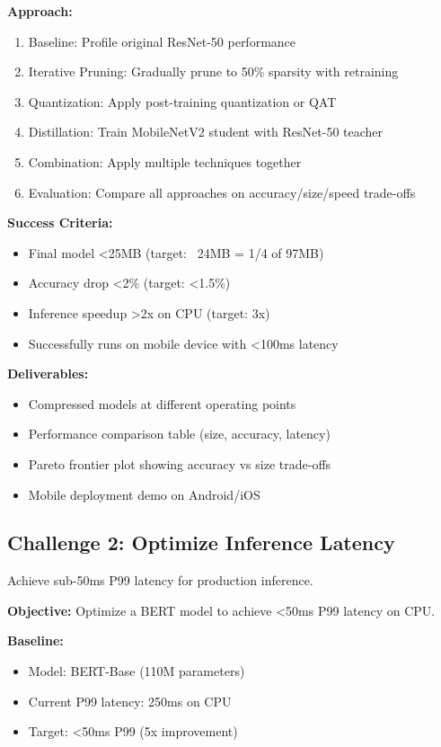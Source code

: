 \textbf{Approach:}
\begin{enumerate}
    \item Baseline: Profile original ResNet-50 performance
    \item Iterative Pruning: Gradually prune to 50\% sparsity with retraining
    \item Quantization: Apply post-training quantization or QAT
    \item Distillation: Train MobileNetV2 student with ResNet-50 teacher
    \item Combination: Apply multiple techniques together
    \item Evaluation: Compare all approaches on accuracy/size/speed trade-offs
\end{enumerate}

\textbf{Success Criteria:}
\begin{itemize}
    \item Final model <25MB (target: ~24MB = 1/4 of 97MB)
    \item Accuracy drop <2\% (target: <1.5\%)
    \item Inference speedup >2x on CPU (target: 3x)
    \item Successfully runs on mobile device with <100ms latency
\end{itemize}

\textbf{Deliverables:}
\begin{itemize}
    \item Compressed models at different operating points
    \item Performance comparison table (size, accuracy, latency)
    \item Pareto frontier plot showing accuracy vs size trade-offs
    \item Mobile deployment demo on Android/iOS
\end{itemize}

\subsection{Challenge 2: Optimize Inference Latency}

Achieve sub-50ms P99 latency for production inference.

\textbf{Objective:} Optimize a BERT model to achieve <50ms P99 latency on CPU.

\textbf{Baseline:}
\begin{itemize}
    \item Model: BERT-Base (110M parameters)
    \item Current P99 latency: 250ms on CPU
    \item Target: <50ms P99 (5x improvement)
\end{itemize}

